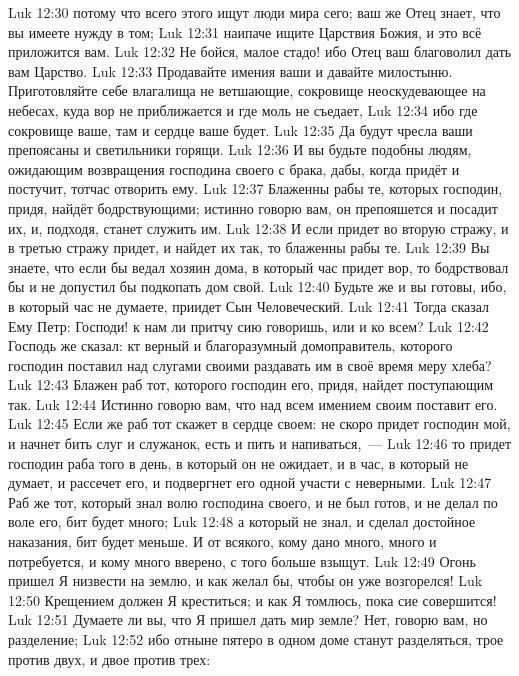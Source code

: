 \vs Luk 12:30 потому что всего этого ищут люди мира сего; ваш же Отец знает, что вы имеете нужду в том;
\vs Luk 12:31 наипаче ищите Царствия Божия, и это всё приложится вам.
\vs Luk 12:32 Не бойся, малое стадо! ибо Отец ваш благоволил дать вам Царство.
\vs Luk 12:33 Продавайте имения ваши и давайте милостыню. Приготовляйте себе влагалища не ветшающие, сокровище неоскудевающее на небесах, куда вор не приближается и где моль не съедает,
\vs Luk 12:34 ибо где сокровище ваше, там и сердце ваше будет.
\rsbpar\vs Luk 12:35 Да будут чресла ваши препоясаны и светильники горящи.
\vs Luk 12:36 И вы будьте подобны людям, ожидающим возвращения господина своего с брака, дабы, когда придёт и постучит, тотчас отворить ему.
\vs Luk 12:37 Блаженны рабы те, которых господин, придя, найдёт бодрствующими; истинно говорю вам, он препояшется и посадит их, и, подходя, станет служить им.
\vs Luk 12:38 И если придет во вторую стражу, и в третью стражу придет, и найдет их так, то блаженны рабы те.
\vs Luk 12:39 Вы знаете, что если бы ведал хозяин дома, в который час придет вор, то бодрствовал бы и не допустил бы подкопать дом свой.
\vs Luk 12:40 Будьте же и вы готовы, ибо, в который час не думаете, приидет Сын Человеческий.
\vs Luk 12:41 Тогда сказал Ему Петр: Господи! к нам ли притчу сию говоришь, или и ко всем?
\vs Luk 12:42 Господь же сказал: кт верный и благоразумный домоправитель, которого господин поставил над слугами своими раздавать им в своё время меру хлеба?
\vs Luk 12:43 Блажен раб тот, которого господин его, придя, найдет поступающим так.
\vs Luk 12:44 Истинно говорю вам, что над всем имением своим поставит его.
\vs Luk 12:45 Если же раб тот скажет в сердце своем: не скоро придет господин мой, и начнет бить слуг и служанок, есть и пить и напиваться,~---
\vs Luk 12:46 то придет господин раба того в день, в который он не ожидает, и в час, в который не думает, и рассечет его, и подвергнет его одной участи с неверными.
\vs Luk 12:47 Раб же тот, который знал волю господина своего, и не был готов, и не делал по воле его, бит будет много;
\vs Luk 12:48 а который не знал, и сделал достойное наказания, бит будет меньше. И от всякого, кому дано много, много и потребуется, и кому много вверено, с того больше взыщут.
\vs Luk 12:49 Огонь пришел Я низвести на землю, и как желал бы, чтобы он уже возгорелся!
\vs Luk 12:50 Крещением должен Я креститься; и как Я томлюсь, пока сие совершится!
\vs Luk 12:51 Думаете ли вы, что Я пришел дать мир земле? Нет, говорю вам, но разделение;
\vs Luk 12:52 ибо отныне пятеро в одном доме станут разделяться, трое против двух, и двое против трех:
